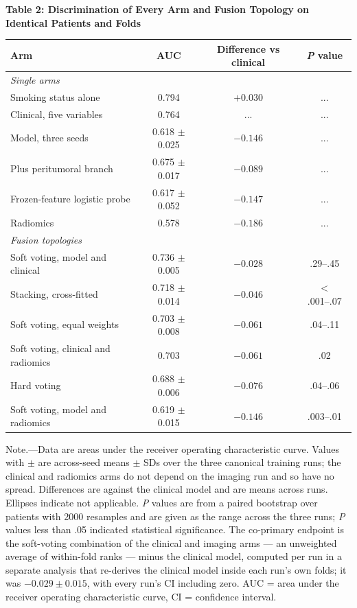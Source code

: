 \documentclass[11pt]{article}
\begin{document}
\clearpage
\begin{table}[H]
\textbf{Table 2: Discrimination of Every Arm and Fusion Topology on Identical
Patients and Folds}

\medskip
\small
\begin{tabular}{lccc}
\toprule
Arm & AUC & Difference vs clinical & \textit{P} value \\
\midrule
\multicolumn{4}{l}{\textit{Single arms}}\\
Smoking status alone            & 0.794 & $+0.030$ & ... \\
Clinical, five variables        & 0.764 & ...      & ... \\
Model, three seeds              & 0.618 $\pm$ 0.025 & $-0.146$ & ... \\
\quad Plus peritumoral branch   & 0.675 $\pm$ 0.017 & $-0.089$ & ... \\
Frozen-feature logistic probe   & 0.617 $\pm$ 0.052 & $-0.147$ & ... \\
Radiomics                       & 0.578 & $-0.186$ & ... \\
\midrule
\multicolumn{4}{l}{\textit{Fusion topologies}}\\
Soft voting, model and clinical & 0.736 $\pm$ 0.005 & $-0.028$ & .29--.45 \\
Stacking, cross-fitted          & 0.718 $\pm$ 0.014 & $-0.046$ & $<$.001--.07 \\
Soft voting, equal weights      & 0.703 $\pm$ 0.008 & $-0.061$ & .04--.11 \\
Soft voting, clinical and radiomics & 0.703 & $-0.061$ & .02 \\
Hard voting                     & 0.688 $\pm$ 0.006 & $-0.076$ & .04--.06 \\
Soft voting, model and radiomics & 0.619 $\pm$ 0.015 & $-0.146$ & .003--.01 \\
\bottomrule
\end{tabular}

\medskip
\footnotesize
Note.---Data are areas under the receiver operating characteristic curve. Values
with $\pm$ are across-seed means $\pm$ SDs over the three canonical training runs;
the clinical and radiomics arms do not depend on the imaging run and so have no
spread. Differences are against the clinical model and are means across runs.
Ellipses indicate not applicable. \textit{P} values are from a paired bootstrap
over patients with 2000 resamples and are given as the range across the three
runs; \textit{P} values less than .05 indicated statistical significance. The
co-primary endpoint is the soft-voting combination of the clinical and imaging
arms --- an unweighted average of within-fold ranks --- minus the clinical model,
computed per run in a separate analysis that re-derives the clinical model inside
each run's own folds; it was $-0.029 \pm 0.015$, with every run's CI including
zero. AUC = area under the receiver operating characteristic curve,
CI = confidence interval.
\end{table}
\end{document}
